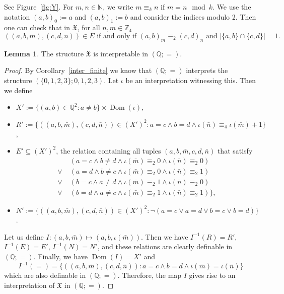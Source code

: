 \documentclass{amsart}
\theoremstyle{definition}
\newtheorem{lemma}[theorem]{Lemma}
\theoremstyle{remark}
\numberwithin{equation}{section}
\newcommand{\mZ}{\mathbb Z}
\newcommand{\dom}{\operatorname{Dom}}
\newcommand{\atoms}{({\mathbb Q};=)}
\newcommand{\fx}{\mathfrak{X}}
\begin{document}
See Figure~\ref{fig:Y}.
For $m,n \in {\mathbb N}$, we write $m \equiv_k n$ if $m = n \mod k$.
We use the notation $(a,b)_0 :=a$ and $(a,b)_1:=b$ and consider the indices modulo 2. 
Then one can check that in $\fx$, for all $n,m \in \mZ_4$
$$((a,b,m),(c,d,n))\in E \text{ if and only if }
(a,b)_m \equiv_2 (c,d)_n \text{ and } |\{a,b\} \cap \{c,d\}|=1.$$

\begin{lemma}\label{interpretable}
	The structure $\fx$ is interpretable in $\atoms$.
\end{lemma}

\begin{proof}
	By Corollary~\ref{inter_finite} we know that $\atoms$ interprets the structure $(\{0,1,2,3\};0,1,2,3)$. Let $\iota$ be an interpretation witnessing this. Then we define
\begin{itemize}
\item $X':={\{(a,b)\in\mathbb{Q}^2}: a\neq b\}\times \dom(\iota)$,
\item $R':=\{((a,b,\bar{m}),(c,d,\bar{n}))\in (X')^2: a=c \wedge b=d \wedge \iota(\bar{n}) \equiv_4 \iota(\bar{m})+1\}$,
\item $E' \subseteq (X')^2$, the relation containing all tuples $(a,b,\bar{m},c,d,\bar{n})$ that satisfy 
\begin{align*}
&(a=c \wedge b\neq d \wedge \iota(\bar{m})\equiv_2 0\wedge \iota(\bar{n})\equiv_2 0)  \\
\vee \; &(a=d\wedge b\neq c \wedge \iota(\bar{m}) \equiv_2 0 \wedge \iota(\bar{n}) \equiv_2 1) \\
\vee \; &(b=c\wedge a\neq d \wedge \iota(\bar{m}) \equiv_2 1 \wedge \iota(\bar{n})\equiv_2 0) \\
\vee \; & (b=d\wedge a\neq c \wedge \iota(\bar{m}) \equiv_2 1 \wedge \iota(\bar{n}) \equiv_2 1)\},
\end{align*}
\item $N':=\{((a,b,\bar{m}),(c,d,\bar{n}))\in ({X}')^2: \neg (a=c\vee a=d\vee b=c \vee b=d)\}$.
\end{itemize}

	Let us define $I \colon (a,b,\bar{m})\mapsto (a,b,\iota(\bar{m}))$. Then we have $I^{-1}(R)=R'$, $I^{-1}(E)=E'$, $I^{-1}(N)=N'$, and these relations are clearly definable in $\atoms$. Finally, we have $\dom(I)=X'$ and $$I^{-1}(=)=\{((a,b,{\bar{m}}),(c,d,{\bar{n}})): a=c\wedge b=d \wedge \iota(\bar{m})=\iota(\bar{n})\}$$ which are also definable in $\atoms$. Therefore, the map $I$ gives rise to an interpretation of $\fx$ in  $\atoms$.
\end{proof}
\end{document}
